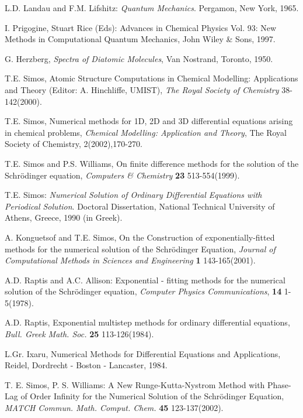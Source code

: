 \documentclass[numreferences]{kluwer}
\begin{document}
\begin{article}
\begin{thebibliography}{120}
 L.D. Landau and F.M.
Lifshitz: {\it Quantum  Mechanics}.  Pergamon,  New York, 1965.

 I. Prigogine,
Stuart Rice (Eds): Advances in Chemical Physics Vol. 93: New
Methods in Computational Quantum Mechanics, John Wiley \& Sons,
1997.

 G. Herzberg, {\it Spectra of
Diatomic Molecules}, Van Nostrand, Toronto, 1950.

 T.E. Simos, Atomic Structure
Computations in Chemical Modelling: Applications and Theory
(Editor: A. Hinchliffe, UMIST), {\it The Royal Society of
Chemistry} 38-142(2000).

  T.E. Simos, Numerical
methods for 1D, 2D and 3D differential equations arising in
chemical problems, {\em Chemical Modelling: Application and
Theory}, The Royal Society of Chemistry, 2(2002),170-270.

 T.E. Simos and
P.S. Williams, On finite difference methods for the solution of
the Schr\"odinger equation, {\it Computers \& Chemistry} {\bf 23}
513-554(1999).

 T.E. Simos: {\it Numerical
Solution of  Ordinary Differential Equations with Periodical
Solution}. Doctoral Dissertation, National Technical University of
Athens, Greece, 1990 (in Greek).

 A. Konguetsof and T.E.
Simos, On the Construction of exponentially-fitted methods for the
numerical solution of the Schr\"odinger Equation, {\it Journal of
Computational Methods in Sciences and Engineering} {\bf 1}
143-165(2001).

 A.D. Raptis and A.C.
Allison: Exponential - fitting  methods  for the numerical
solution of the Schr\"odinger   equation, \textit{Computer Physics
Communications}, {\bf 14} 1-5(1978).

 A.D. Raptis, Exponential
multistep methods for ordinary differential equations, {\it Bull.
Greek Math. Soc.} {\bf 25} 113-126(1984).

 L.Gr.  Ixaru, Numerical Methods
for Differential Equations and Applications, Reidel, Dordrecht -
Boston - Lancaster, 1984.

 T. E. Simos, P. S.
Williams: A New Runge-Kutta-Nystrom Method with Phase-Lag of Order
Infinity for the Numerical Solution of the Schr\"odinger Equation,
{\it MATCH Commun. Math. Comput. Chem.} {\bf 45} 123-137(2002).


\end{thebibliography}
\end{article}
\end{document}
